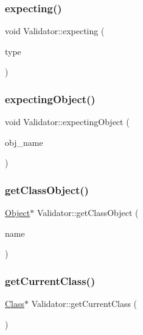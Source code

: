 \subsubsection{\texorpdfstring{expecting()}{expecting()}}
{\footnotesize\ttfamily void Validator\+::expecting (\begin{DoxyParamCaption}\item[{\hyperlink{statics_8h_a0674a913b8e8c8a9f265baab3646b565}{V\+A\+L\+U\+E\+\_\+\+T\+Y\+PE}}]{type }\end{DoxyParamCaption})}

\mbox{\label{classValidator_a6a88dbc8624b8803408094c16a98c205}} 
\subsubsection{\texorpdfstring{expecting\+Object()}{expectingObject()}}
{\footnotesize\ttfamily void Validator\+::expecting\+Object (\begin{DoxyParamCaption}\item[{std\+::string}]{obj\+\_\+name }\end{DoxyParamCaption})}

\mbox{\label{classValidator_afe99d9833e5cda3ab1aab764ab99d716}} 
\subsubsection{\texorpdfstring{get\+Class\+Object()}{getClassObject()}}
{\footnotesize\ttfamily \hyperlink{classObject}{Object}$\ast$ Validator\+::get\+Class\+Object (\begin{DoxyParamCaption}\item[{std\+::string}]{name }\end{DoxyParamCaption})}

\mbox{\label{classValidator_a342833ad81caff452754620d29083a3d}} 
\subsubsection{\texorpdfstring{get\+Current\+Class()}{getCurrentClass()}}
{\footnotesize\ttfamily \hyperlink{classClass}{Class}$\ast$ Validator\+::get\+Current\+Class (\begin{DoxyParamCaption}{ }\end{DoxyParamCaption})}

